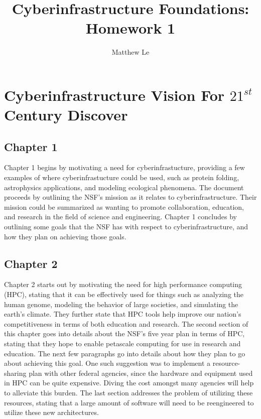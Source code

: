 \documentclass[11pt]{article}
\title{Cyberinfrastructure Foundations: Homework 1}
\author{Matthew Le}
\begin{document}
\maketitle



\section{Cyberinfrastructure Vision For $21^{st}$ Century Discover}

\subsection{Chapter 1}

Chapter 1 begins by motivating a need for cyberinfrastucture, providing a few examples of where cyberinfrastucture could be used, such as protein folding, astrophysics applications, and modeling ecological phenomena.  The document proceeds by outlining the NSF's mission as it relates to cyberinfrastructure.  Their mission could be summarized as wanting to promote collaboration, education, and research in the field of science and engineering.  Chapter 1 concludes by outlining some goals that the NSF has with respect to cyberinfrastructure, and how they plan on achieving those goals.

\subsection{Chapter 2}

Chapter 2 starts out by motivating the need for high performance computing (HPC), stating that it can be effectively used for things such as analyzing the human genome, modeling the behavior of large societies, and simulating the earth's climate.  They further state that HPC tools help improve our nation's competitiveness in terms of both education and research.  The second section of this chapter goes into details about the NSF's five year plan in terms of HPC, stating that they hope to enable petascale computing for use in research and education.  The next few paragraphs go into details about how they plan to go about achieving this goal.  One such suggestion was to implement a resource-sharing plan with other federal agencies, since the hardware and equipment used in HPC can be quite expensive.  Diving the cost amongst many agencies will help to alleviate this burden.  The last section addresses the problem of utilizing these resources, stating that a large amount of software will need to be reengineered to utilize these new architectures.  
\end{document}
